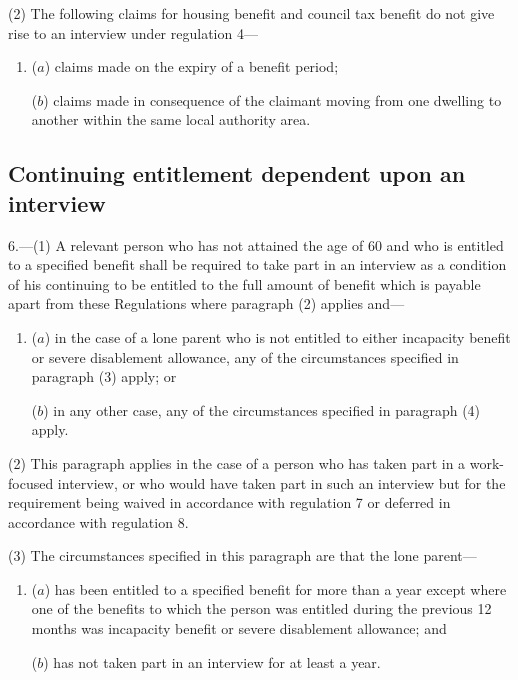 \documentclass[12pt,a4paper]{article}
\begin{document}
(2) The following claims for housing benefit and council tax benefit do not give rise to an interview under regulation 4—
\begin{enumerate}\item[]
($a$) claims made on the expiry of a benefit period;

($b$) claims made in consequence of the claimant moving from one dwelling to another within the same local authority area.
\end{enumerate}


\subsection[6. Continuing entitlement dependent upon an interview]{Continuing entitlement dependent upon an interview}

6.—(1)  A relevant person who has not attained the age of 60 and who is entitled to a specified benefit shall be required to take part in an interview as a condition of his continuing to be entitled to the full amount of benefit which is payable apart from these Regulations where paragraph (2) applies and—
\begin{enumerate}\item[]
($a$) in the case of a lone parent who is not entitled to either incapacity benefit or severe disablement allowance, any of the circumstances specified in paragraph (3) apply; or

($b$) in any other case, any of the circumstances specified in paragraph (4) apply.
\end{enumerate}

(2) This paragraph applies in the case of a person who has taken part in a work-focused interview, or who would have taken part in such an interview but for the requirement being waived in accordance with regulation 7 or deferred in accordance with regulation 8.

(3) The circumstances specified in this paragraph are that the lone parent—
\begin{enumerate}\item[]
($a$)  has been entitled to a specified benefit for more than a year except where one of the benefits to which the person was entitled during the previous 12 months was incapacity benefit or severe disablement allowance; and

($b$) has not taken part in an interview for at least a year.
\end{enumerate}
\end{document}
